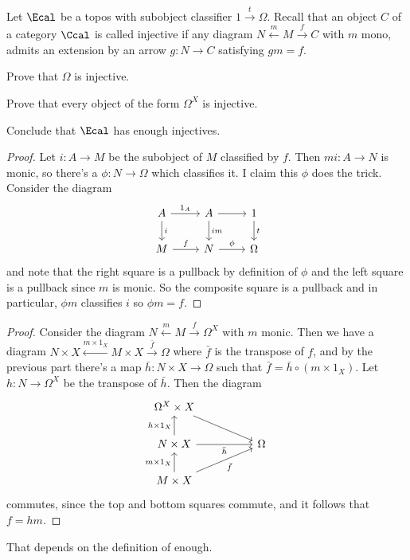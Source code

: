 \begin{exercise}{8}
    Let $\Ecal$ be a topos with subobject classifier $1\xrightarrow{t}\Omega$. Recall that an object $C$ of a category $\Ccal$ is called injective if any diagram $N\xleftarrow{m} M\xrightarrow{f} C$ with $m$ mono, admits an extension by an arrow $g\colon N\to C$ satisfying $gm=f$.
    \begin{exercises}
        \item Prove that $\Omega$ is injective.
        \item Prove that every object of the form $\Omega^X$ is injective.
        \item Conclude that $\Ecal$ has enough injectives.
    \end{exercises}
\begin{solution}
    \begin{exercises}
        \item \begin{proof}
            Let $i\colon A\to M$ be the subobject of $M$ classified by $f$. Then $mi\colon A\to N$ is monic, so there's a $\phi\colon N\to\Omega$ which classifies it. I claim this $\phi$ does the trick. Consider the diagram
            \[ \begin{tikzcd}
                A \arrow[d, "i"] \arrow[r, "1_A"] & A \arrow[d, "im"] \arrow[r] & 1 \arrow[d, "t"] \\
                M \arrow[r, "f"]                  & N \arrow[r, "\phi"]         & \Omega          
            \end{tikzcd} \]
            and note that the right square is a pullback by definition of $\phi$ and the left square is a pullback since $m$ is monic. So the composite square is a pullback and in particular, $\phi m$ classifies $i$ so $\phi m = f$.
        \end{proof}
        \item \begin{proof}
            Consider the diagram $N\xleftarrow{m} M\xrightarrow{f}\Omega^X$ with $m$ monic. Then we have a diagram $N\times X\xleftarrow{m\times 1_X} M\times X\xrightarrow{\bar{f}}\Omega$ where $\bar{f}$ is the transpose of $f$, and by the previous part there's a map $\bar{h}\colon N\times X\to\Omega$ such that $\bar{f}=\bar{h}\circ(m\times 1_X)$. Let $h\colon N\to\Omega^X$ be the transpose of $\bar{h}$. Then the diagram
            \[ \begin{tikzcd}
                \Omega^X\times X \arrow[rrd]                              &  &        \\
                N\times X \arrow[rr, "\bar h"'] \arrow[u, "h\times 1_X"]  &  & \Omega \\
                M\times X \arrow[rru, "\bar f"'] \arrow[u, "m\times 1_X"] &  &       
            \end{tikzcd} \]
            commutes, since the top and bottom squares commute, and it follows that $f=hm$.
        \end{proof}
        \item That depends on the definition of enough.
    \end{exercises}
\end{solution}
\end{exercise}

